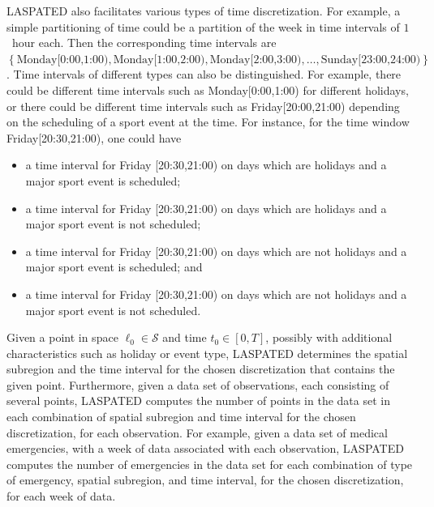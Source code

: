 \documentclass[article]{jss}
\begin{document}
LASPATED also facilitates various types of time discretization.
For example, a simple partitioning of time could be a partition of the week in time intervals of $1$~hour each.
Then the corresponding time intervals are $\left\{\mbox{Monday[0:00,1:00)},\mbox{Monday[1:00,2:00)},\mbox{Monday[2:00,3:00)},\ldots,\mbox{Sunday[23:00,24:00)}\right\}$.
Time intervals of different types can also be distinguished.
For example, there could be different time intervals such as Monday[0:00,1:00) for different holidays, or there could be different time intervals such as Friday[20:00,21:00) depending on the scheduling of a sport event at the time.
For instance, for the time window Friday[20:30,21:00), one could have
\begin{itemize}
\item
a time interval for Friday [20:30,21:00) on days which are holidays and a major sport event is scheduled;
\item
a time interval for Friday [20:30,21:00) on days which are holidays and a major sport event is not scheduled;
\item
a time interval for Friday [20:30,21:00) on days which are not holidays and a major sport event is scheduled; and
\item
a time interval for Friday [20:30,21:00) on days which are not holidays and a major sport event is not scheduled.
\end{itemize}
Given a point in space $\ell_{0} \in \mathcal{S}$ and time $t_{0} \in [0,T]$, possibly with additional characteristics such as holiday or event type, LASPATED determines the spatial subregion and the time interval for the chosen discretization that contains the given point.
Furthermore, given a data set of observations, each consisting of several points, LASPATED computes the number of points in the data set in each combination of spatial subregion and time interval for the chosen discretization, for each observation.
For example, given a data set of medical emergencies, with a week of data associated with each observation, LASPATED computes the number of emergencies in the data set for each combination of type of emergency, spatial subregion, and time interval, for the chosen discretization, for each week of data.
\end{document}
